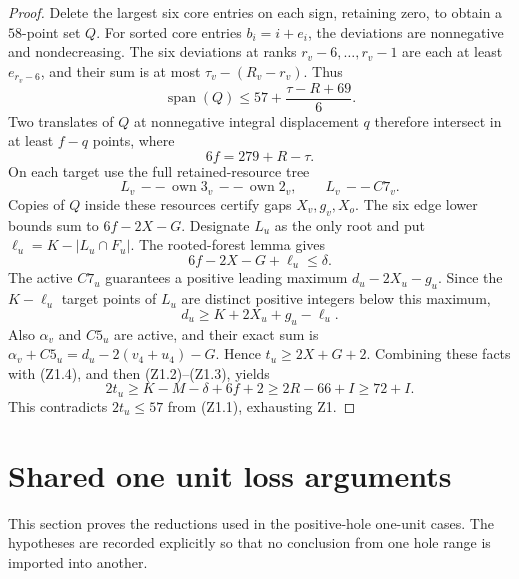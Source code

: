 \documentclass[11pt,letterpaper]{article}
\newcommand{\card}[1]{\lvert#1\rvert}
\newcommand{\own}{\operatorname{own}}
\theoremstyle{definition}\newtheorem{definition}[theorem]{Definition}
\begin{document}
\begin{proof}
Delete the largest six core entries on each sign, retaining zero, to obtain a $58$-point set $Q$. For sorted core entries $b_i=i+e_i$, the deviations are nonnegative and nondecreasing. The six deviations at ranks $r_v-6,\ldots,r_v-1$ are each at least $e_{r_v-6}$, and their sum is at most $\tau_v-(R_v-r_v)$. Thus
\[
\operatorname{span}(Q)\le57+\frac{\tau-R+69}{6}.
\]
Two translates of $Q$ at nonnegative integral displacement $q$ therefore intersect in at least $f-q$ points, where
\[
6f=279+R-\tau.\tag{Z1.3}
\]
On each target use the full retained-resource tree
\[
L_v\,--\,\own3_v\,--\,\own2_v,\qquad L_v\,--\,C7_v.
\]
Copies of $Q$ inside these resources certify gaps $X_v,g_v,X_o$. The six edge lower bounds sum to $6f-2X-G$. Designate $L_u$ as the only root and put $\ell_u=K-\card{L_u\cap F_u}$. The rooted-forest lemma gives
\[
6f-2X-G+\ell_u\le\delta.\tag{Z1.4}
\]
The active $C7_u$ guarantees a positive leading maximum $d_u-2X_u-g_u$. Since the $K-\ell_u$ target points of $L_u$ are distinct positive integers below this maximum,
\[
d_u\ge K+2X_u+g_u-\ell_u.
\]
Also $\alpha_v$ and $C5_u$ are active, and their exact sum is
$\alpha_v+C5_u=d_u-2(v_4+u_4)-G$. Hence $t_u\ge2X+G+2$.
Combining these facts with (Z1.4), and then (Z1.2)--(Z1.3), yields
\[
2t_u\ge K-M-\delta+6f+2
\ge2R-66+I\ge72+I.
\]
This contradicts $2t_u\le57$ from (Z1.1), exhausting Z1.
\end{proof}


\section{Shared one unit loss arguments}\label{sec:one-tools}
This section proves the reductions used in the positive-hole one-unit cases. The hypotheses are recorded explicitly so that no conclusion from one hole range is imported into another.
\end{document}
